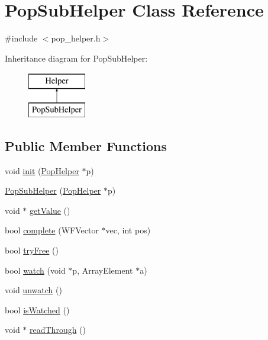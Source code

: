\hypertarget{class_pop_sub_helper}{}\section{Pop\+Sub\+Helper Class Reference}
\label{class_pop_sub_helper}


{\ttfamily \#include $<$pop\+\_\+helper.\+h$>$}

Inheritance diagram for Pop\+Sub\+Helper\+:\begin{figure}[H]
\begin{center}
\leavevmode
\includegraphics[height=2.000000cm]{class_pop_sub_helper}
\end{center}
\end{figure}
\subsection*{Public Member Functions}
\begin{DoxyCompactItemize}
\item 
void \hyperlink{class_pop_sub_helper_aa2830f2758975fb78e4d603ecf582092}{init} (\hyperlink{class_pop_helper}{Pop\+Helper} $\ast$p)
\item 
\hyperlink{class_pop_sub_helper_ad743a1ad146cc5a21a33300857b6989f}{Pop\+Sub\+Helper} (\hyperlink{class_pop_helper}{Pop\+Helper} $\ast$p)
\item 
void $\ast$ \hyperlink{class_pop_sub_helper_acbb3db6f8695be462af7d7e0a0853c9b}{get\+Value} ()
\item 
bool \hyperlink{class_pop_sub_helper_ae594014ef3cb91ecf55fa5d76eb2bf21}{complete} (W\+F\+Vector $\ast$vec, int pos)
\item 
bool \hyperlink{class_pop_sub_helper_ab3d196973dfda34200dcc16bce0b303b}{try\+Free} ()
\item 
bool \hyperlink{class_pop_sub_helper_ae4e86d5f4ba56ee2e0933f666964dcde}{watch} (void $\ast$p, Array\+Element $\ast$a)
\item 
void \hyperlink{class_pop_sub_helper_ac6b19047e3869d29875d8d8399f271cf}{unwatch} ()
\item 
bool \hyperlink{class_pop_sub_helper_a627522e3169aa505ac817cbe6d63d634}{is\+Watched} ()
\item 
void $\ast$ \hyperlink{class_pop_sub_helper_af568847074d4622ffdae03990ea83dfb}{read\+Through} ()
\end{DoxyCompactItemize}
